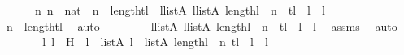 \begin{isabellebody}
\ \ \ \ \ \ {\isachardoublequoteopen}{\isacharparenleft}{\kern0pt}{\isasymAnd}n{\isachardot}{\kern0pt}\ n\ {\isasymin}\ nat\ {\isasymLongrightarrow}\ n\ {\isasymle}\ length{\isacharparenleft}{\kern0pt}tl{\isacharparenright}{\kern0pt}\ {\isasymLongrightarrow}\ {\isasymexists}l{}{\isasymin}list{\isacharparenleft}{\kern0pt}A{\isacharparenright}{\kern0pt}{\isachardot}{\kern0pt}\ {\isasymexists}l{}{\isasymin}list{\isacharparenleft}{\kern0pt}A{\isacharparenright}{\kern0pt}{\isachardot}{\kern0pt}\ length{\isacharparenleft}{\kern0pt}l{}{\isacharparenright}{\kern0pt}\ {\isacharequal}{\kern0pt}\ n\ {\isasymand}\ tl\ {\isacharequal}{\kern0pt}\ l{}\ {\isacharat}{\kern0pt}\ l{}{\isacharparenright}{\kern0pt}{\isachardoublequoteclose}\ \isanewline
\isanewline
\ \ \ \ \isamarkupfalse%
\ \isamarkupfalse%
\ {\isachardoublequoteopen}n{\isacharprime}{\kern0pt}\ {\isasymle}\ length{\isacharparenleft}{\kern0pt}tl{\isacharparenright}{\kern0pt}{\isachardoublequoteclose}\ \isamarkupfalse%
\ auto\ \isanewline
\ \ \ \ \isamarkupfalse%
\ \isamarkupfalse%
\ {\isachardoublequoteopen}{\isasymexists}l{}{\isasymin}list{\isacharparenleft}{\kern0pt}A{\isacharparenright}{\kern0pt}{\isachardot}{\kern0pt}\ {\isasymexists}l{}{\isasymin}list{\isacharparenleft}{\kern0pt}A{\isacharparenright}{\kern0pt}{\isachardot}{\kern0pt}\ length{\isacharparenleft}{\kern0pt}l{}{\isacharparenright}{\kern0pt}\ {\isacharequal}{\kern0pt}\ n{\isacharprime}{\kern0pt}\ {\isasymand}\ tl\ {\isacharequal}{\kern0pt}\ l{}\ {\isacharat}{\kern0pt}\ l{}{\isachardoublequoteclose}\ \isamarkupfalse%
\ assms{}\ \isamarkupfalse%
\ auto\ \isanewline
\ \ \ \ \isamarkupfalse%
\ \isamarkupfalse%
\ l{}\ l{}\ \ H\ {\isacharcolon}{\kern0pt}\ {\isachardoublequoteopen}l{}\ {\isasymin}\ list{\isacharparenleft}{\kern0pt}A{\isacharparenright}{\kern0pt}{\isachardoublequoteclose}\ {\isachardoublequoteopen}l{}\ {\isasymin}\ list{\isacharparenleft}{\kern0pt}A{\isacharparenright}{\kern0pt}{\isachardoublequoteclose}\ {\isachardoublequoteopen}length{\isacharparenleft}{\kern0pt}l{}{\isacharparenright}{\kern0pt}\ {\isacharequal}{\kern0pt}\ n{\isacharprime}{\kern0pt}{\isachardoublequoteclose}\ {\isachardoublequoteopen}tl\ {\isacharequal}{\kern0pt}\ l{}\ {\isacharat}{\kern0pt}\ l{}{\isachardoublequoteclose}\ \isamarkupfalse%

\end{isabellebody}
